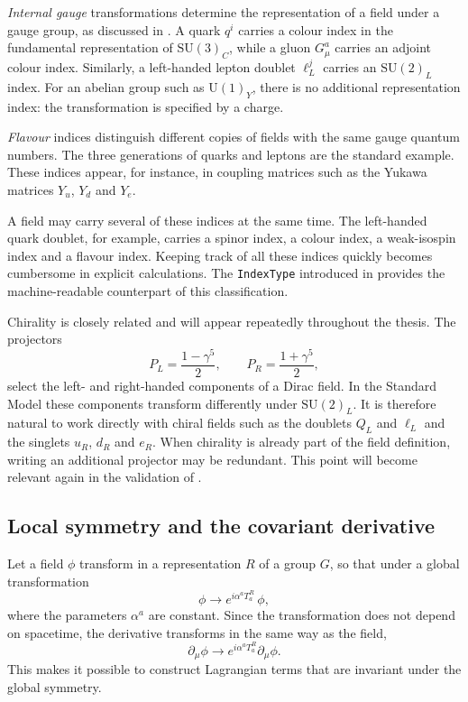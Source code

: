 \emph{Internal gauge} transformations determine the representation of a
field under a gauge group, as discussed in . A quark
$q^i$ carries a colour index in the fundamental representation of
$\mathrm{SU}(3)_C$, while a gluon $G^a_\mu$ carries an adjoint colour index.
Similarly, a left-handed lepton doublet $\ell_L^j$ carries an
$\mathrm{SU}(2)_L$ index. For an abelian group such as $\mathrm{U}(1)_Y$,
there is no additional representation index: the transformation is specified
by a charge.

\emph{Flavour} indices distinguish different copies of fields with the same
gauge quantum numbers. The three generations of quarks and leptons are the
standard example. These indices appear, for instance, in coupling matrices
such as the Yukawa matrices $Y_u$, $Y_d$ and $Y_e$.

A field may carry several of these indices at the same time. The
left-handed quark doublet, for example, carries a spinor index, a colour
index, a weak-isospin index and a flavour index. Keeping track of all these
indices quickly becomes cumbersome in explicit calculations. The
\texttt{IndexType} introduced in  provides the
machine-readable counterpart of this classification.

Chirality is closely related and will appear repeatedly throughout the
thesis. The projectors
\begin{equation}
P_L = \frac{1-\gamma^5}{2}, \qquad
P_R = \frac{1+\gamma^5}{2},
\label{eq:theory-projectors}
\end{equation}
select the left- and right-handed components of a Dirac field. In the
Standard Model these components transform differently under
$\mathrm{SU}(2)_L$. It is therefore natural to work directly with chiral
fields such as the doublets $Q_L$ and $\ell_L$ and the singlets
$u_R$, $d_R$ and $e_R$. When chirality is already part of the field
definition, writing an additional projector may be redundant. This point
will become relevant again in the validation of .


\subsection{Local symmetry and the covariant derivative}
\label{sec:theory-covd}

Let a field $\phi$ transform in a representation $R$ of a group $G$, so that
under a global transformation
\begin{equation}
    \phi \longrightarrow e^{i \alpha^a T_a^R}\, \phi ,
\end{equation}
where the parameters $\alpha^a$ are constant. Since the transformation does
not depend on spacetime, the derivative transforms in the same way as the
field,
\begin{equation}
    \partial_\mu\phi
    \longrightarrow
    e^{i\alpha^a T_a^R}\partial_\mu\phi .
\end{equation}
This makes it possible to construct Lagrangian terms that are invariant under
the global symmetry.

